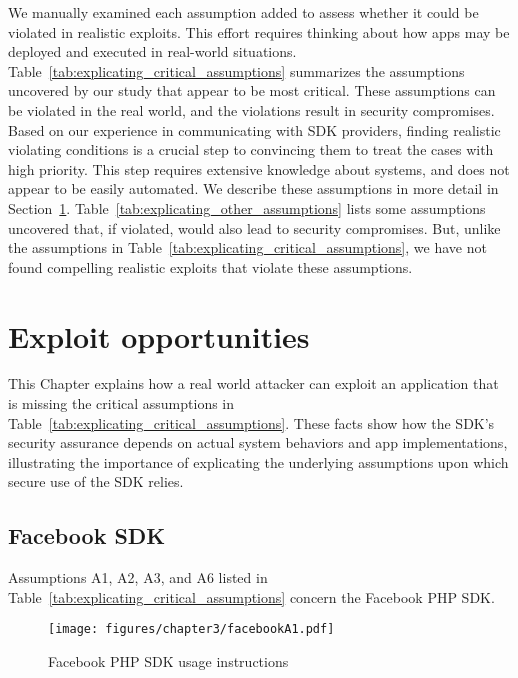 

  We manually examined each assumption added to assess whether it could be violated in realistic exploits.  This effort requires thinking about how apps may be deployed and executed in real-world situations.  Table~\ref{tab:explicating_critical_assumptions} summarizes the assumptions uncovered by our study that appear to be most critical.  These assumptions can be violated in the real world, and the violations result in security compromises.  Based on our experience in communicating with SDK providers, finding realistic violating conditions is a crucial step to convincing them to treat the cases with high priority.  This step requires extensive knowledge about systems, and does not appear to be easily automated.  We describe these assumptions in more detail in Section~\ref{sec:explicating_exploit_opportunities}.  Table~\ref{tab:explicating_other_assumptions} lists some assumptions uncovered that, if violated, would also lead to security compromises.  But, unlike the assumptions in Table~\ref{tab:explicating_critical_assumptions}, we have not found compelling realistic exploits that violate these assumptions.  



\section{Exploit opportunities}
\label{sec:explicating_exploit_opportunities}

This Chapter explains how a real world attacker can exploit an application that is missing the critical assumptions in Table~\ref{tab:explicating_critical_assumptions}.  These facts show how the SDK's security assurance depends on actual system behaviors and app implementations, illustrating the importance of explicating the underlying assumptions upon which secure use of the SDK relies.  

\subsection{Facebook SDK}

Assumptions A1, A2, A3, and A6 listed in Table~\ref{tab:explicating_critical_assumptions} concern the Facebook PHP SDK.

\begin{figure}[hbt]
\centering
\texttt{[image: figures/chapter3/facebookA1.pdf]}
\caption{Facebook PHP SDK usage instructions}
\label{fig:facebookA1}
\end{figure}


